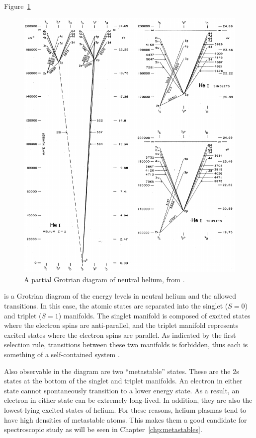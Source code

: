 Figure~\ref{fig:grotrian}
\begin{figure}
  \centering
  \includegraphics{./chapters/theory/figures/grotrian.pdf}
  \caption{A partial Grotrian diagram of neutral helium, from \cite{Moore1968}.}
  \label{fig:grotrian}
\end{figure}
is a Grotrian diagram of the energy levels in neutral helium and the allowed
transitions. In this case, the atomic states are separated into the singlet
($S=0$) and triplet ($S = 1$) manifolds. The singlet manifold is composed of
excited states where the electron spins are anti-parallel, and the triplet
manifold represents excited states where the electron spins are parallel. As
indicated by the first selection rule, transitions between these two manifolds
is forbidden, thus each is something of a self-contained system
\cite{Herzberg1944}.

Also observable in the diagram are two ``metastable'' states. These are the 2s
states at the bottom of the singlet and triplet manifolds. An electron in either
state cannot spontaneously transition to a lower energy state. As a result, an
electron in either state can be extremely long-lived. In addition, they are also
the lowest-lying excited states of helium. For these reasons, helium plasmas
tend to have high densities of metastable atoms. This makes them a good
candidate for spectroscopic study as will be seen in
Chapter~\ref{chp:metastables}.

